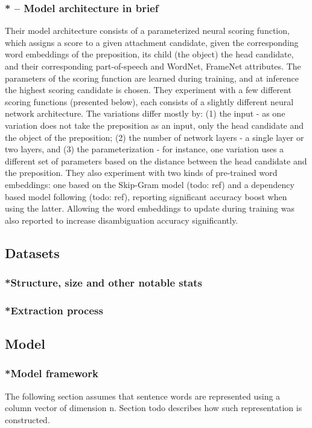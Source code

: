 \subsubsection{* -- Model architecture in brief}
Their model architecture consists of a parameterized neural scoring function, which assigns a score to a given attachment candidate, given the corresponding word embeddings of the preposition, its child (the object) the head candidate, and their corresponding part-of-speech and WordNet, FrameNet attributes. The parameters of the scoring function are learned during training, and at inference the highest scoring candidate is chosen. They experiment with a few different scoring functions (presented below), each consists of a slightly different neural network architecture. The variations differ mostly by: (1)  the input - as one variation does not take the preposition as an input, only the head candidate and the object of the preposition; (2) the number of network layers - a single layer or two layers, and (3) the parameterization - for instance, one variation uses a different set of parameters based on the distance between the head candidate and the preposition. They also experiment with two kinds of pre-trained word embeddings: one based on the Skip-Gram model (todo: ref) and a dependency based model following (todo: ref), reporting significant accuracy boost when using the latter. Allowing the word embeddings to update during training was also reported to increase disambiguation accuracy significantly. 

\subsection{Datasets}
\subsubsection{*Structure, size and other notable stats}
\subsubsection{*Extraction process}

\subsection{Model}
\subsubsection{*Model framework}
The following section assumes that sentence words are represented using a column vector of dimension n. Section todo describes how such representation is constructed. 

